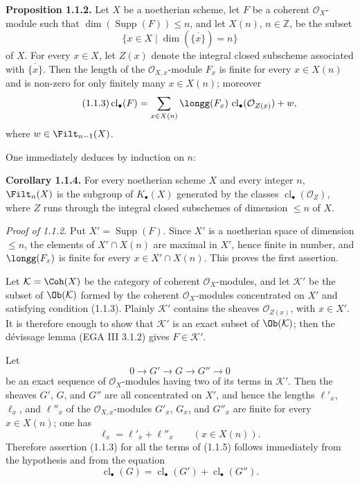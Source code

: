 \documentclass[11pt]{article}
\newcommand{\cl}{\operatorname{cl}}
\providecommand{\Supp}{\operatorname{Supp}}
\begin{document}
\textbf{Proposition 1.1.2.} Let $X$ be a noetherian scheme, let $F$ be a coherent $\mathcal O_X$-module such that $\dim(\Supp(F))\leq n$, and let $X(n)$, $n\in\mathbb Z$, be the subset
\[
 \{x\in X\mid \dim(\overline{\{x\}})=n\}
\]
of $X$. For every $x\in X$, let $Z(x)$ denote the integral closed subscheme associated with $\overline{\{x\}}$. Then the length of the $\mathcal O_{X,x}$-module $F_x$ is finite for every $x\in X(n)$ and is non-zero for only finitely many $x\in X(n)$; moreover
\begin{equation}\tag{1.1.3}
 \cl_\bullet(F)=\sum_{x\in X(n)}\longg(F_x)\,\cl_\bullet(\mathcal O_{Z(x)})+w,
\end{equation}
where $w\in \Filt_{n-1}(X)$.

One immediately deduces by induction on $n$:

\textbf{Corollary 1.1.4.} For every noetherian scheme $X$ and every integer $n$, $\Filt_n(X)$ is the subgroup of $K_\bullet(X)$ generated by the classes $\cl_\bullet(\mathcal O_Z)$, where $Z$ runs through the integral closed subschemes of dimension $\leq n$ of $X$.

\emph{Proof of 1.1.2.} Put $X'=\Supp(F)$. Since $X'$ is a noetherian space of dimension $\leq n$, the elements of $X'\cap X(n)$ are maximal in $X'$, hence finite in number, and $\longg(F_x)$ is finite for every $x\in X'\cap X(n)$. This proves the first assertion.

Let $\mathcal K=\Coh(X)$ be the category of coherent $\mathcal O_X$-modules, and let $\mathcal K'$ be the subset of $\Ob(\mathcal K)$ formed by the coherent $\mathcal O_X$-modules concentrated on $X'$ and satisfying condition (1.1.3). Plainly $\mathcal K'$ contains the sheaves $\mathcal O_{Z(x)}$, with $x\in X'$. It is therefore enough to show that $\mathcal K'$ is an exact subset of $\Ob(\mathcal K)$; then the dévissage lemma (EGA III 3.1.2) gives $F\in\mathcal K'$.

Let
\begin{equation}\tag{1.1.5}
0\longrightarrow G'\longrightarrow G\longrightarrow G''\longrightarrow0
\end{equation}
be an exact sequence of $\mathcal O_X$-modules having two of its terms in $\mathcal K'$. Then the sheaves $G'$, $G$, and $G''$ are all concentrated on $X'$, and hence the lengths $\ell'_x$, $\ell_x$, and $\ell''_x$ of the $\mathcal O_{X,x}$-modules $G'_x$, $G_x$, and $G''_x$ are finite for every $x\in X(n)$; one has
\begin{equation}\tag{1.1.6}
 \ell_x=\ell'_x+\ell''_x\qquad (x\in X(n)).
\end{equation}
Therefore assertion (1.1.3) for all the terms of (1.1.5) follows immediately from the hypothesis and from the equation
\begin{equation}\tag{1.1.7}
 \cl_\bullet(G)=\cl_\bullet(G')+\cl_\bullet(G'').
\end{equation}
\end{document}
